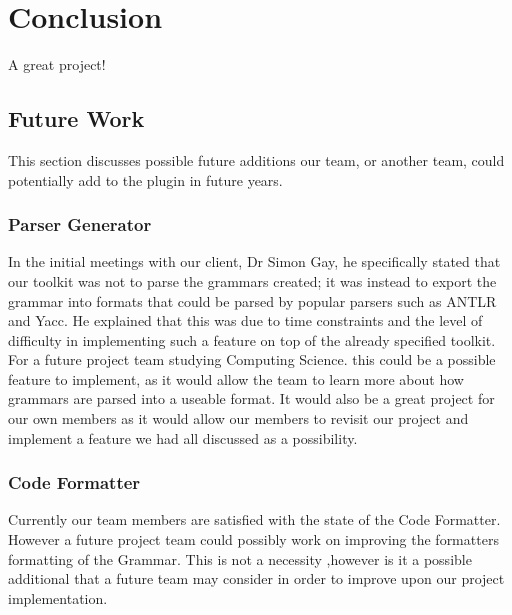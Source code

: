 \chapter{Conclusion}
\label{conclusion}

A great project!

\section{Future Work}
This section discusses possible future additions our team, or another team, could potentially add to the plugin in future years. 

\subsection{Parser Generator}
In the initial meetings with our client, Dr Simon Gay, he specifically stated that our toolkit was not to parse the grammars created; it was instead to export the grammar into formats that could be parsed by popular parsers such as ANTLR and Yacc. He explained that this was due to time constraints and the level of difficulty in implementing such a feature on top of the already specified toolkit. For a future project team studying Computing Science. this could be a possible feature to implement, as it would allow the team to learn more about how grammars are parsed into a useable format. It would also be a great project for our own members as it would allow our members to revisit our project and implement a feature we had all discussed as a possibility. 

\subsection{Code Formatter}
Currently our team members are satisfied with the state of the Code Formatter. However a future project team could possibly work on improving the formatters formatting of the Grammar. This is not a necessity ,however is it a possible additional that a future team may consider in order to improve upon our project implementation. 
